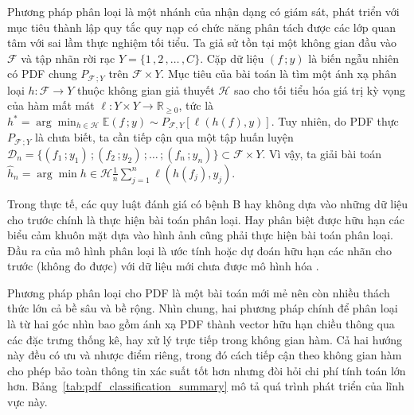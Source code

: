 \documentclass[a4paper,oneside]{book} %
\theoremstyle{plain}
\theoremstyle{plain}
\theoremstyle{nonumberplain}
\begin{document}
Phương pháp phân loại là một nhánh của nhận dạng có giám sát, phát triển với mục tiêu thành lập quy tắc quy nạp có chức năng phân tách được các lớp quan tâm với sai lầm thực nghiệm tối tiểu.  Ta giả sử tồn tại một không gian đầu vào $\mathcal{F}$ và tập nhãn rời rạc ${Y} = \{1\,,2\,, \ldots\,, C\}$. Cặp dữ liệu $(f\,; y)$ là biến ngẫu nhiên có PDF chung $P_{\mathcal{F}\,;Y}$ trên $\mathcal{F} \times {Y}$.  Mục tiêu của bài toán là tìm một ánh xạ phân loại $h : \mathcal{F} \to {Y}$ thuộc không gian giả thuyết $\mathcal{H}$ sao cho tối tiểu hóa giá trị kỳ vọng của hàm mất mát $\ell : {Y} \times {Y} \to \mathbb{R}_{\ge 0}$, tức là $
h^* = \arg\min_{h \in \mathcal{H}} \mathbb{E}{(f\,;y)\sim P_{\mathcal{F},Y}} \left[\ell(h(f), y)\right].$ Tuy nhiên, do PDF thực $P_{\mathcal{F}\,;{Y}}$ là chưa biết, ta cần tiếp cận qua một tập huấn luyện $\mathcal{D}_n = \{(f_1\,; y_1)\,;(f_2\,;y_2)\,; \ldots\,; (f_n\,; y_n)\} \subset \mathcal{F} \times {Y}$. Vì vậy, ta giải bài toán $
\hat{h}_n = \arg\min{h \in \mathcal{H}} \frac{1}{n} \sum_{j=1}^n \ell(h(f_j), y_j).
$

Trong thực tế, các quy luật đánh giá có bệnh B hay không dựa vào những dữ liệu cho trước chính là thực hiện bài toán phân loại. Hay phân biệt được hữu hạn các biểu cảm khuôn mặt dựa vào hình ảnh cũng phải thực hiện bài toán phân loại. Đầu ra của mô hình phân loại là ước tính hoặc dự đoán hữu hạn các nhãn cho trước (không đo được) với dữ liệu mới chưa được mô hình hóa \cite{Fillmore-Patrick_2025}. 

Phương pháp phân loại cho PDF là một bài toán mới mẻ nên còn nhiều thách thức lớn cả bề sâu và bề rộng. Nhìn chung, hai phương pháp chính để phân loại là từ hai góc nhìn bao gồm ánh xạ PDF thành vector hữu hạn chiều thông qua các đặc trưng thống kê, hay xử lý trực tiếp trong không gian hàm. Cả hai hướng này đều có ưu và nhược điểm riêng, trong đó cách tiếp cận theo không gian hàm cho phép bảo toàn thông tin xác suất tốt hơn nhưng đòi hỏi chi phí tính toán lớn hơn. Bảng~\ref{tab:pdf_classification_summary} mô tả quá trình phát triển của lĩnh vực này. 
\end{document}
